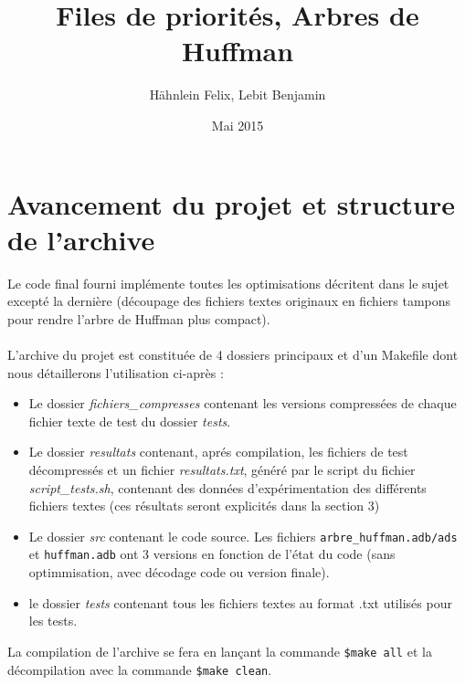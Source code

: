 \documentclass[a4paper,11pt]{article}
\title{Files de priorités, Arbres de Huffman}
\author{Hähnlein Felix, Lebit Benjamin}
\date{Mai 2015}
\begin{document}
\maketitle

\section{Avancement du projet et structure de l'archive}
Le code final fourni implémente toutes les optimisations décritent dans le sujet excepté la dernière (découpage des fichiers textes originaux en fichiers tampons pour rendre l'arbre de Huffman plus compact). \\\\
L'archive du projet est constituée de 4 dossiers principaux et d'un Makefile dont nous détaillerons l'utilisation ci-après :
\begin{itemize}
\item Le dossier \textit{fichiers\_compresses} contenant les versions compressées de chaque fichier texte de test du dossier \textit{tests}.
\item Le dossier \textit{resultats} contenant, aprés compilation, les fichiers de test décompressés et un fichier \textit{resultats.txt}, généré par le script du fichier\textit{ script\_tests.sh}, contenant des données d'expérimentation des différents fichiers textes (ces résultats seront explicités dans la section 3)
\item Le dossier \textit{src} contenant le code source. Les fichiers \verb+arbre_huffman.adb/ads+ et \verb+huffman.adb+ ont 3 versions en fonction de l'état du code (sans optimmisation, avec décodage code ou version finale).
\item le dossier \textit{tests} contenant tous les fichiers textes au format .txt utilisés pour les tests.
\end{itemize}
La compilation de l'archive se fera en lançant la commande \verb+$make all+ et la décompilation avec la commande \verb+$make clean+. \\
\end{document}
